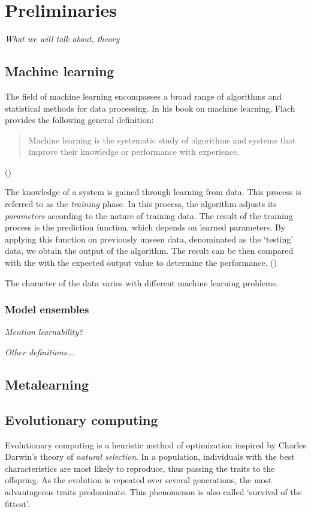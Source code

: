 \chapter{Preliminaries}

\textit{What we will talk about, theory}

\section{Machine learning}
The field of machine learning encompasses a broad range of algorithms and statistical methods for data processing. In his book on machine learning, Flach provides the following general definition:

\blockquote{Machine learning is the systematic study of algorithms and systems that improve their knowledge or performance with experience.} (\cite{Flach:2012:MLA:2490546}) %
%
%

The knowledge of a system is gained through learning from data. This process is referred to as the \textit{training} phase. In this process, the algorithm adjusts its \textit{parameters} according to the nature of training data. 
The result of the training process is the prediction function, which depends on learned parameters. By applying this function on previously unseen data, denominated as the `testing' data, we obtain the output of the algorithm. The result can be then compared with the with the expected output value to determine the performance. (\cite{Bishop:2006:PRM:1162264})

The character of the data varies with different machine learning problems. 
%
%

\subsection{Model ensembles}
\textit{Mention learnability?}

\textit{Other definitions...}

\section{Metalearning}


\section{Evolutionary computing}
Evolutionary computing is a heuristic method of optimization inspired by Charles Darwin's theory of \textit{natural selection}. \cite{darwin} In a population, individuals with the best characteristics are most likely to reproduce, thus passing the traits to the offspring. As the evolution is repeated over several generations, the most advantageous traits predominate. This phenomenon is also called `survival of the fittest'. %

